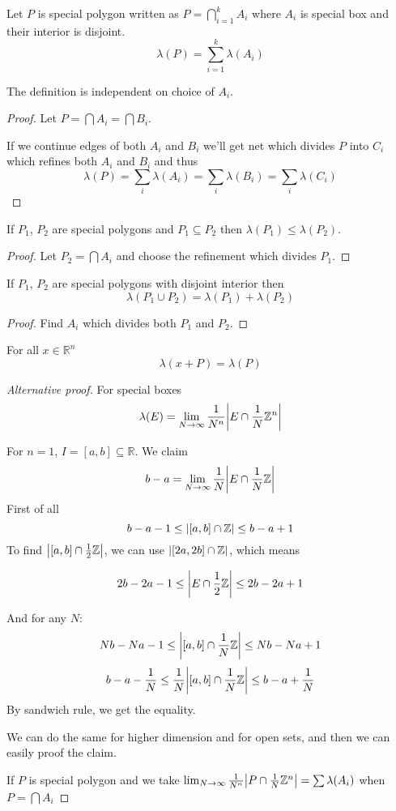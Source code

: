  Let $P$ is special polygon written as $P = \bigcap_{i=1}^k A_i$ where $A_i$ is special box and their interior is disjoint.
 $$\lambda(P) = \sum_{i=1}^k \lambda(A_i)$$
 \begin{prop}
 	The definition is independent on choice of $A_i$.
 	\begin{proof}
 		Let $P = \bigcap A_i = \bigcap B_i$.
 		
 		If we continue edges of both $A_i$ and $B_i$ we'll get net which divides $P$ into $C_i$ which refines both $A_i$ and $B_i$ and thus
 		$$\lambda(P) = \sum_i \lambda(A_i) = \sum_i \lambda(B_i) = \sum_i \lambda(C_i)$$ 
 	\end{proof}
 \end{prop}

\begin{prop}
	If $P_1$, $P_2$ are special polygons and $P_1\subseteq P_2$ then $\lambda(P_1)\leq \lambda(P_2)$.
	\begin{proof}
		Let $P_2= \bigcap A_i$ and choose the refinement which divides $P_1$. 
	\end{proof}
\end{prop}

\begin{prop}
	If $P_1$, $P_2$ are  special polygons with disjoint interior then
	$$\lambda(P_1\cup P_2) =  \lambda(P_1)+\lambda(P_2)$$
	\begin{proof}
		Find $A_i$ which divides both $P_1$ and $P_2$.
	\end{proof}
\end{prop}

\begin{prop}
	For all $x\in \mathbb{R}^n$ 
	$$\lambda(x+P) = \lambda(P)$$
\end{prop}

	\begin{proof}[Alternative proof]
For special boxes
$$\lambda(E) = \lim_{N\to \infty} \frac{1}{N^n} \abs{E \cap \frac{1}{N}\mathbb{Z}^n}$$

For $n=1$, $I=[a,b] \subseteq \mathbb{R}$. We claim
$$b-a = \lim_{N\to \infty} \frac{1}{N} \abs{E \cap \frac{1}{N}\mathbb{Z}}$$
First of all
$$b-a-1 \leq \abs{[a,b] \cap \mathbb{Z}} \leq b-a+1$$
To find $\abs{[a,b] \cap \frac{1}{2}\mathbb{Z}}$, we can use $\abs{[2a,2b] \cap \mathbb{Z}}$, which means

$$2b-2a-1 \leq \abs{E \cap \frac{1}{2}\mathbb{Z}} \leq 2b-2a+1$$

And for any $N$:
$$Nb-Na-1 \leq \abs{[a,b] \cap \frac{1}{N}\mathbb{Z}} \leq Nb-Na+1$$
$$b-a-\frac{1}{N} \leq \frac{1}{N}\abs{[a,b] \cap \frac{1}{N}\mathbb{Z}} \leq b-a+\frac{1}{N}$$
By sandwich rule, we get the equality.

We can do the same for higher dimension and for open sets, and then we can easily proof the claim.

If $P$ is special polygon and we take $\lim_{N\to \infty} \frac{1}{N^n} \abs{P \cap \frac{1}{N}\mathbb{Z}^n} = \sum \lambda(A_i) $
when $P=\bigcap A_i$

\end{proof}

